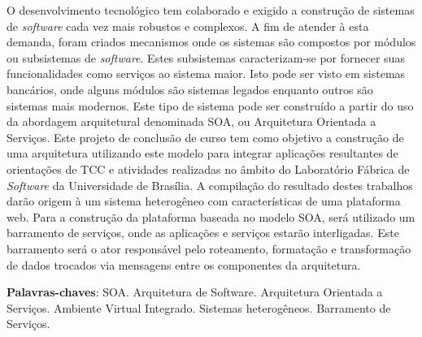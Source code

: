 \begin{resumo}

O desenvolvimento tecnológico tem colaborado e exigido a construção de sistemas de \textit{software} cada vez mais robustos e complexos. A fim de atender à esta demanda, foram criados mecanismos onde os sistemas são compostos por módulos ou subsistemas de \textit{software}. Estes subsistemas caracterizam-se por fornecer suas funcionalidades como serviços ao sistema maior. Isto pode ser visto em sistemas bancários, onde alguns módulos são sistemas legados enquanto outros são sistemas mais modernos. Este tipo de sistema pode ser construído a partir do uso da abordagem arquitetural denominada SOA, ou Arquitetura Orientada a Serviços. Este projeto de conclusão de curso tem como objetivo a construção de uma arquitetura utilizando este modelo para integrar aplicações resultantes de orientações de TCC e atividades realizadas no âmbito do Laboratório Fábrica de \textit{Software} da Universidade de Brasília. A compilação do resultado destes trabalhos darão origem à um sistema heterogêneo com características de uma plataforma web. Para a construção da plataforma baseada no modelo SOA, será utilizado um barramento de serviços, onde as aplicações e serviços estarão interligadas. Este barramento será o ator responsável pelo roteamento, formatação e transformação de dados trocados via mensagens entre os componentes da arquitetura.

 \vspace{\onelineskip}
    
 \noindent
 \textbf{Palavras-chaves}: SOA. Arquitetura de Software. Arquitetura Orientada a Serviços. Ambiente Virtual Integrado. Sistemas heterogêneos. Barramento de Serviços.
\end{resumo}
